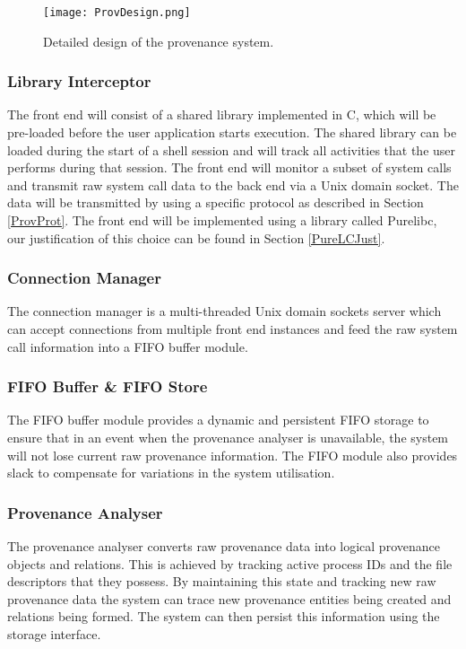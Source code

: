 \begin{figure}
\texttt{[image: ProvDesign.png]}
\label{fig:detdes}
\caption{Detailed design of the provenance system.}
\end{figure}

\subsubsection{Library Interceptor}
The front end will consist of a shared library implemented in C, which will be pre-loaded before the user application starts execution. The shared library can be loaded during the start of a shell session and will track all activities that the user performs during that session. The front end will monitor a subset of system calls and transmit raw system call data to the back end via a Unix domain socket. The data will be transmitted by using a specific protocol as described in Section \ref{ProvProt}. The front end will be implemented using a library called Purelibc, our justification of this choice can be found in Section \ref{PureLCJust}.

\subsubsection{Connection Manager}
The connection manager is a multi-threaded Unix domain sockets server which can accept connections from multiple front end instances and feed the raw system call information into a FIFO buffer module.

\subsubsection{FIFO Buffer \& FIFO Store}
The FIFO buffer module provides a dynamic and persistent FIFO storage to ensure that in an event when the provenance analyser is unavailable, the system will not lose current raw provenance information. The FIFO module also provides slack to compensate for variations in the system utilisation.

\subsubsection{Provenance Analyser}
The provenance analyser converts raw provenance data into logical provenance objects and relations. This is achieved by tracking active process IDs and the file descriptors that they possess. By maintaining this state and tracking new raw provenance data the system can trace new provenance entities being created and relations being formed. The system can then persist this information using the storage interface.

